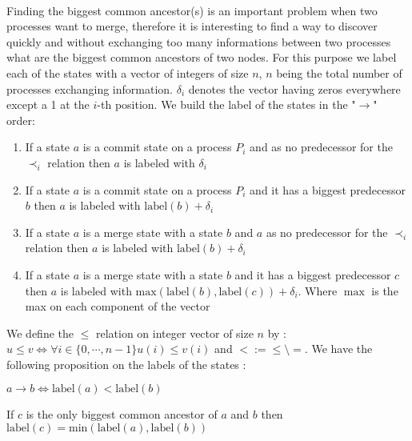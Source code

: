 \paragraph{} Finding the biggest common ancestor(s) is an important problem when two processes want to merge, therefore it is interesting to find a way to discover quickly and without exchanging too many informations between two processes what are the biggest common ancestors of two nodes. For this purpose we label each of the states with a vector of integers of size $n$, $n$ being the total number of processes exchanging information. $\delta_i$ denotes the vector having zeros everywhere except a 1 at the $i$-th position. We build the label of the states in the "$\rightarrow$" order:
\begin{enumerate}
 \item If a state $a$ is a commit state on a process $P_i$ and as no predecessor for the $\prec_i$ relation then $a$ is labeled with $\delta_i$
 \item If a state $a$ is a commit state on a process $P_i$ and it has a biggest predecessor $b$ then $a$ is labeled with $\mathrm{label}(b) + \delta_i$
 \item If a state $a$ is a merge state with a state $b$ and $a$ as no predecessor for the $\prec_i$ relation then $a$ is labeled with $\mathrm{label}(b) + \delta_i$
 \item If a state $a$ is a merge state with a state $b$ and it has a biggest predecessor $c$ then $a$ is labeled with $\mathrm{max}(\mathrm{label}(b),\mathrm{label}(c)) + \delta_i$. Where $\max$ is the max on each component of the vector
\end{enumerate}
We define the $\leq$ relation on integer vector of size $n$ by : $u\leq v \Leftrightarrow \forall i \in \{0,\cdots,n-1\} u(i) \leq v(i)$ and $< := \leq \setminus =$. We have the following proposition on the labels of the states :
\begin{proposition}
 $ a \rightarrow b \Leftrightarrow \mathrm{label}(a) <  \mathrm{label}(b)$
\end{proposition}
\begin{proposition}
 If $c$ is the only biggest common ancestor of $a$ and $b$ then $\mathrm{label}(c) = \mathrm{min}(\mathrm{label}(a),\mathrm{label}(b))$
\end{proposition}



